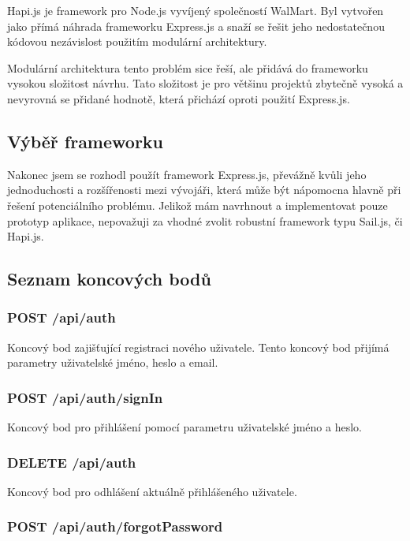 Hapi.js je framework pro Node.js vyvíjený společností WalMart.
Byl vytvořen jako přímá náhrada frameworku Express.js a snaží se řešit jeho nedostatečnou kódovou nezávislost použitím modulární architektury.

Modulární architektura tento problém sice řeší, ale přidává do frameworku vysokou složitost návrhu.
Tato složitost je pro většinu projektů zbytečně vysoká a nevyrovná se přidané hodnotě, která přichází oproti použití Express.js.

\subsection{Výběř frameworku}\label{subsec:výběřFrameworku}

Nakonec jsem se rozhodl použít framework Express.js, převážně kvůli jeho jednoduchosti a rozšířenosti mezi vývojáři, která může být nápomocna hlavně při řešení potenciálního problému.
Jelikož mám navrhnout a implementovat pouze prototyp aplikace, nepovažuji za vhodné zvolit robustní framework typu Sail.js, či Hapi.js.

\subsection{Seznam koncových bodů}\label{subsec:seznamKoncovýchBodů}

\subsubsection{POST /api/auth}

Koncový bod zajišťující registraci nového uživatele.
Tento koncový bod přijímá parametry uživatelské jméno, heslo a email.

\subsubsection{POST /api/auth/signIn}

Koncový bod pro přihlášení pomocí parametru uživatelské jméno a heslo.

\subsubsection{DELETE /api/auth}

Koncový bod pro odhlášení aktuálně přihlášeného uživatele.

\subsubsection{POST /api/auth/forgotPassword}

